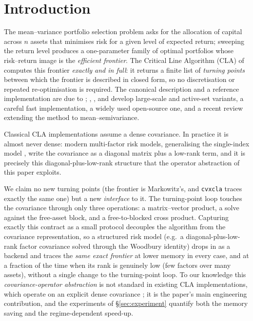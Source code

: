 \documentclass[11pt]{article}
\begin{document}
\tableofcontents

\section{Introduction}

The mean--variance portfolio selection problem \citep{markowitz1952} asks for the
allocation of capital across $n$ assets that minimises risk for a given level of
expected return; sweeping the return level produces a one-parameter family of optimal
portfolios whose risk--return image is the \emph{efficient frontier}. The Critical Line
Algorithm (CLA) of \citet{markowitz1956, markowitz1959} computes this frontier
\emph{exactly and in full}: it returns a finite list of \emph{turning points} between
which the frontier is described in closed form, so no discretisation or repeated
re-optimisation is required. The canonical description and a reference implementation
are due to \citet{markowitz2000}; \citet{perold1984}, \citet{stein2008}, and
\citet{hirschberger2010} develop large-scale and active-set variants,
\citet{niedermayer2010} a careful fast implementation, \citet{bailey2013} a widely used
open-source one, and \citet{markowitz2021} a recent review extending the method to
mean--semivariance.

Classical CLA implementations assume a dense covariance. In practice it is almost never
dense: modern multi-factor risk models, generalising the single-index model
\citep{sharpe1963}, write the covariance as a diagonal matrix plus a low-rank term, and
it is precisely this diagonal-plus-low-rank structure that the operator abstraction of
this paper exploits.

We claim no new turning points (the frontier is Markowitz's, and \texttt{cvxcla}
traces exactly the same one) but a new \emph{interface} to it. The turning-point
loop touches the covariance through only three operations: a matrix--vector
product, a solve against the free-asset block, and a free-to-blocked cross product.
Capturing exactly this contract as a small protocol decouples the algorithm from
the covariance representation, so a structured risk model (e.g.\ a
diagonal-plus-low-rank factor covariance solved through the Woodbury identity)
drops in as a backend and traces the \emph{same exact frontier} at lower memory in
every case, and at a fraction of the time when its rank is genuinely low (few
factors over many assets), without a single change to the turning-point loop. To
our knowledge this \emph{covariance-operator abstraction} is not standard in
existing CLA implementations, which operate on an explicit dense covariance
\citep{markowitz2000, bailey2013}; it is the paper's main engineering contribution,
and the experiments of \S\ref{sec:experiment} quantify both the memory saving and
the regime-dependent speed-up.
\end{document}
